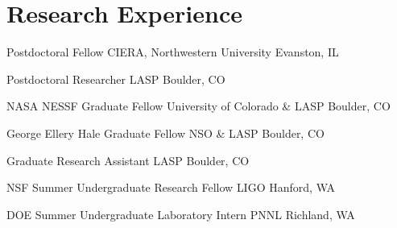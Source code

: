 \section{Research Experience}


		{Postdoctoral Fellow}
		{CIERA, Northwestern University}
		{Evanston, IL}
		{}
		{}


		{Postdoctoral Researcher}
		{LASP}
		{Boulder, CO}
		{}
		{}


		{NASA NESSF Graduate Fellow}
		{University of Colorado \& LASP}
		{Boulder, CO}
		{}
		{}

		{George Ellery Hale Graduate Fellow}
		{NSO \& LASP}
		{Boulder, CO}
		{}
		{}

		{Graduate Research Assistant}
		{LASP}
		{Boulder, CO}
		{}
		{}



		{NSF Summer Undergraduate Research Fellow}
		{LIGO}
		{Hanford, WA}
		{}
		{}

		{DOE Summer Undergraduate Laboratory Intern}
		{PNNL}
		{Richland, WA}
		{}
		{}
